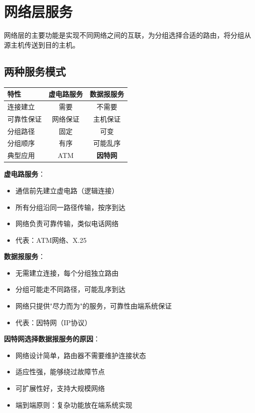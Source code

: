 \documentclass[12pt,a4paper,openany]{ctexbook}
\begin{document}
\section{网络层服务}
网络层的主要功能是实现不同网络之间的互联，为分组选择合适的路由，将分组从源主机传送到目的主机。

\subsection{两种服务模式}
\begin{table}[htbp]
\centering\small
\begin{tabular}{lcc}
\toprule
\textbf{特性} & \textbf{虚电路服务} & \textbf{数据报服务} \\
\midrule
连接建立 & 需要 & 不需要 \\
可靠性保证 & 网络保证 & 主机保证 \\
分组路径 & 固定 & 可变 \\
分组顺序 & 有序 & 可能乱序 \\
典型应用 & ATM & \textbf{因特网} \\
\bottomrule
\end{tabular}
\end{table}

\textbf{虚电路服务}：
\begin{itemize}[leftmargin=2em,itemsep=0pt]
    \item 通信前先建立虚电路（逻辑连接）
    \item 所有分组沿同一路径传输，按序到达
    \item 网络负责可靠传输，类似电话网络
    \item 代表：ATM网络、X.25
\end{itemize}

\textbf{数据报服务}：
\begin{itemize}[leftmargin=2em,itemsep=0pt]
    \item 无需建立连接，每个分组独立路由
    \item 分组可能走不同路径，可能乱序到达
    \item 网络只提供"尽力而为"的服务，可靠性由端系统保证
    \item 代表：因特网（IP协议）
\end{itemize}

\begin{notebox}
\textbf{因特网选择数据报服务的原因}：
\begin{itemize}[itemsep=0pt]
    \item 网络设计简单，路由器不需要维护连接状态
    \item 适应性强，能够绕过故障节点
    \item 可扩展性好，支持大规模网络
    \item 端到端原则：复杂功能放在端系统实现
\end{itemize}
\end{notebox}
\end{document}
